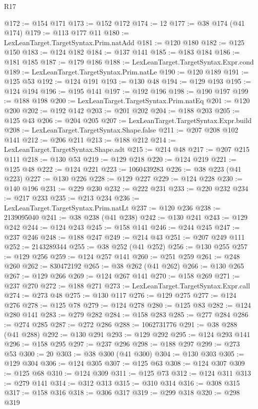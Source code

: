 \begin{lexlean}{R17}
\begin{coremodule}
@172 := @154 @171
@173 := @152 @172
@174 := 12
@177 := @38 @174 (@41 @174)
@179 := @113 @177 @11
@180 := LexLeanTarget.TargetSyntax.Prim.natAdd
@181 := @120 @180
@182 := @125 @150
@183 := @124 @182
@184 := @137 @141
@185 := @183 @184
@186 := @181 @185
@187 := @179 @186
@188 := LexLeanTarget.TargetSyntax.Expr.cond
@189 := LexLeanTarget.TargetSyntax.Prim.natLe
@190 := @120 @189
@191 := @125 @53
@192 := @124 @191
@193 := @130 @48
@194 := @129 @193
@195 := @124 @194
@196 := @195 @141
@197 := @192 @196
@198 := @190 @197
@199 := @188 @198
@200 := LexLeanTarget.TargetSyntax.Prim.natEq
@201 := @120 @200
@202 := @192 @142
@203 := @201 @202
@204 := @188 @203
@205 := @125 @43
@206 := @204 @205
@207 := LexLeanTarget.TargetSyntax.Expr.build
@208 := LexLeanTarget.TargetSyntax.Shape.false
@211 := @207 @208 @102 @141
@212 := @206 @211
@213 := @188 @212
@214 := LexLeanTarget.TargetSyntax.Shape.adt
@215 := @214 @48
@217 := @207 @215 @111
@218 := @130 @53
@219 := @129 @218
@220 := @124 @219
@221 := @125 @48
@222 := @124 @221
@223 := 1060439283
@226 := @38 @223 (@41 @223)
@227 := @130 @226
@228 := @129 @227
@229 := @124 @228
@230 := @140 @196
@231 := @229 @230
@232 := @222 @231
@233 := @220 @232
@234 := @217 @233
@235 := @213 @234
@236 := LexLeanTarget.TargetSyntax.Prim.natLt
@237 := @120 @236
@238 := 2139095040
@241 := @38 @238 (@41 @238)
@242 := @130 @241
@243 := @129 @242
@244 := @124 @243
@245 := @158 @141
@246 := @244 @245
@247 := @237 @246
@248 := @188 @247
@249 := @214 @43
@251 := @207 @249 @111
@252 := 2143289344
@255 := @38 @252 (@41 @252)
@256 := @130 @255
@257 := @129 @256
@259 := @124 @257 @141
@260 := @251 @259
@261 := @248 @260
@262 := 830472192
@265 := @38 @262 (@41 @262)
@266 := @130 @265
@267 := @129 @266
@269 := @124 @267 @141
@270 := @158 @269
@271 := @237 @270
@272 := @188 @271
@273 := LexLeanTarget.TargetSyntax.Expr.call
@274 := @273 @48
@275 := @130 @117
@276 := @129 @275
@277 := @124 @276
@278 := @125 @78
@279 := @124 @278
@280 := @125 @83
@282 := @124 @280 @141
@283 := @279 @282
@284 := @158 @283
@285 := @277 @284
@286 := @274 @285
@287 := @272 @286
@288 := 1062731776
@291 := @38 @288 (@41 @288)
@292 := @130 @291
@293 := @129 @292
@295 := @124 @293 @141
@296 := @158 @295
@297 := @237 @296
@298 := @188 @297
@299 := @273 @53
@300 := 20
@303 := @38 @300 (@41 @300)
@304 := @130 @303
@305 := @129 @304
@306 := @124 @305
@307 := @125 @63
@308 := @124 @307
@309 := @125 @68
@310 := @124 @309
@311 := @125 @73
@312 := @124 @311
@313 := @279 @141
@314 := @312 @313
@315 := @310 @314
@316 := @308 @315
@317 := @158 @316
@318 := @306 @317
@319 := @299 @318
@320 := @298 @319

\end{coremodule}
\end{lexlean}
